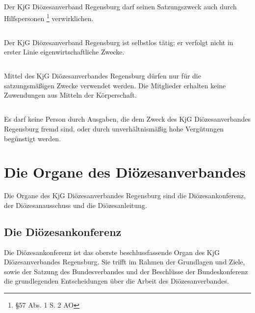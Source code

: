 \documentclass[12pt]{report}
\begin{document}
\begin{flushleft}
\subsection{}
Der KjG Diözesanverband Regensburg darf seinen Satzungszweck auch durch Hilfspersonen \footnote{§57 Abs. 1 S. 2 AO}
verwirklichen.
\subsection{}
Der KjG Diözesanverband Regensburg ist selbstlos tätig; er verfolgt nicht in erster Linie eigenwirtschaftliche Zwecke.
\subsection{}
Mittel des KjG Diözesanverbandes Regensburg dürfen nur für die satzungsmäßigen Zwecke
verwendet werden. Die Mitglieder erhalten keine Zuwendungen aus Mitteln der Körperschaft.
\subsection{}
Es darf keine Person durch Ausgaben, die dem Zweck des KjG Diözesanverbandes Regensburg
fremd sind, oder durch unverhältnismäßig hohe Vergütungen begünstigt werden.
\section{Die Organe des Diözesanverbandes}
Die Organe des KjG Diözesanverbandes Regensburg sind die Diözesankonferenz, der Diözesanausschuss und die
Diözesanleitung.

\subsection{Die Diözesankonferenz}
Die Diözesankonferenz ist das oberste beschlussfassende Organ des KjG Diözesanverbandes Regensburg. Sie
trifft im Rahmen der Grundlagen und Ziele, sowie der Satzung des Bundesverbandes und der
Beschlüsse der Bundeskonferenz die grundlegenden Entscheidungen über die Arbeit des Diözesanverbandes.

\end{flushleft}
\end{document}
